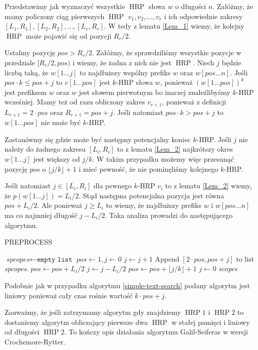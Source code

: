 \documentclass{article}
\DeclareMathOperator{\HRP}{HRP}
\begin{document}
Przedstawimy jak wyznaczyć wszystkie $\HRP$ słowa $w$ o długości $n$.
Załóżmy, że mamy policzony ciąg pierwszych $\HRP$ $v_1, v_2, ..., v_r$ i ich odpowiednie zakresy $[L_1, R_1], [L_2, R_2], ..., [L_r, R_r]$.
W tedy z lematu \ref{Lem_1} wiemy, że kolejny $\HRP$ może pojawić się od pozycji $R_r / 2$. 

Ustalmy pozycję $pos > R_r / 2$.
Załóżmy, że sprawdziliśmy wszystkie pozycje w przedziale $[R_r / 2, pos)$ i wiemy, że żadna z nich nie jest $\HRP$.
Niech $j$ będzie liczbą taką, że $w[1...j]$ to najdłuższy wspólny prefiks $w$ oraz $w[pos...n]$. 
Jeśli $pos \cdot k \leq pos + j$ to $v[1...pos]$ jest $k$-HRP słowa $w$, ponieważ $(w[1...pos])^k$ jest prefiksem $w$ oraz $w$ jest słowem pierwotnym bo inaczej znaleźlibyśmy $k$-HRP wcześniej.
Mamy też od razu obliczony zakres $v_{r+1}$, ponieważ z definicji $L_{r+1} = 2 \cdot pos$ oraz $R_{r+1} = pos + j$.
Jeśli natomiast $pos \cdot k > pos + j$ to $w[1...pos]$ nie może być $k$-HRP.

Zastanówmy się gdzie może być następny potencjalny koniec $k$-HRP.
Jeśli $j$ nie należy do żadnego zakresu $[L_i, R_i]$ to z lematu \ref{Lem_2} najkrótszy okres $w[1...j]$ jest większy od $j/k$. W takim przypadku możemy więc przesunąć pozycję $pos$ o $\lfloor j / k \rfloor + 1$ i mieć pewność, że nie pominęliśmy kolejnego $k$-HRP.

Jeśli natomiast $j \in [L_i, R_i]$ dla pewnego $k$-HRP $v_i$ to z lematu \ref{Lem_2} wiemy, że $p(w[1...j]) = L_i / 2$. Stąd następna potencjalna pozycja jest równa $pos + L_i / 2$. Ale ponieważ $j \geq L_i$ to wiemy, że najdłuższy prefiks $w$ i $w[pos...n]$ ma co najmniej długość $j - L_i / 2$. 
Taka analiza prowadzi do następującego algorytmu.

\begin{algorithm}[H]
\caption{PREPROCESS}
\label{preprocess}
\begin{algorithmic} 
\STATE $\textit{spcopes} \gets \texttt{empty list}$
\STATE $pos \gets 1, j \gets 0$
        \STATE $j \gets j + 1$
    \ENDWHILE
        \STATE Append $[2 \cdot pos, pos + j]$ to list \textit{spcopes}.
    \ENDIF
        \STATE $pos \gets pos + L_i / 2$
        \STATE $j \gets j - L_i / 2$
    \ELSE
        \STATE $pos \gets pos + \lfloor j / k \rfloor + 1$
        \STATE $j \gets 0$
    \ENDIF
\ENDWHILE
\RETURN \textit{scopes}
\end{algorithmic}
\end{algorithm}

Podobnie jak w przypadku algorytmu \ref{simple-text-search} podany algorytm jest liniowy ponieważ cały czas rośnie wartość $k \cdot pos + j$.

Zauważmy, że jeśli zatrzymamy algorytm gdy znajdziemy $\HRP1$ i $\HRP2$ to dostaniemy algorytm obliczający pierwsze dwa $\HRP$ w stałej pamięci i liniowy od długości $\HRP2$.
To kończy opis działania algorytmu Galil-Seiferas w wersji Crochemore-Rytter.
\end{document}
